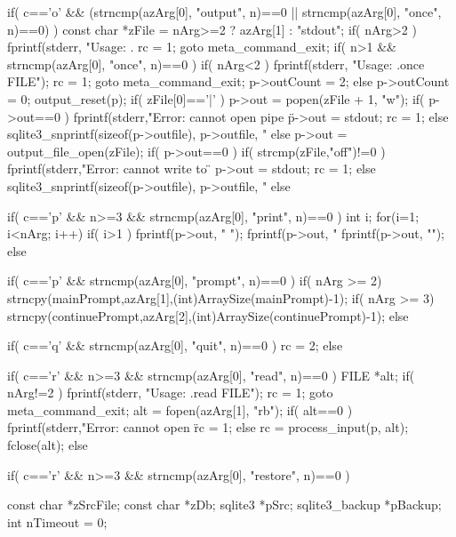 \begin{Codex}[label=shell.c,numbers=left]
{  if( c=='o'
   && (strncmp(azArg[0], "output", n)==0 || strncmp(azArg[0], "once", n)==0)
  ){
    const char *zFile = nArg>=2 ? azArg[1] : "stdout";
    if( nArg>2 ){
      fprintf(stderr, "Usage: .%
      rc = 1;
      goto meta_command_exit;
    }
    if( n>1 && strncmp(azArg[0], "once", n)==0 ){
      if( nArg<2 ){
        fprintf(stderr, "Usage: .once FILE\n");
        rc = 1;
        goto meta_command_exit;
      }
      p->outCount = 2;
    }else{
      p->outCount = 0;
    }
    output_reset(p);
    if( zFile[0]=='|' ){
      p->out = popen(zFile + 1, "w");
      if( p->out==0 ){
        fprintf(stderr,"Error: cannot open pipe \"%
        p->out = stdout;
        rc = 1;
      }else{
        sqlite3_snprintf(sizeof(p->outfile), p->outfile, "%
      }
    }else{
      p->out = output_file_open(zFile);
      if( p->out==0 ){
        if( strcmp(zFile,"off")!=0 ){
          fprintf(stderr,"Error: cannot write to \"%
        }
        p->out = stdout;
        rc = 1;
      } else {
        sqlite3_snprintf(sizeof(p->outfile), p->outfile, "%
      }
    }
  }else

  if( c=='p' && n>=3 && strncmp(azArg[0], "print", n)==0 ){
    int i;
    for(i=1; i<nArg; i++){
      if( i>1 ) fprintf(p->out, " ");
      fprintf(p->out, "%
    }
    fprintf(p->out, "\n");
  }else

  if( c=='p' && strncmp(azArg[0], "prompt", n)==0 ){
    if( nArg >= 2) {
      strncpy(mainPrompt,azArg[1],(int)ArraySize(mainPrompt)-1);
    }
    if( nArg >= 3) {
      strncpy(continuePrompt,azArg[2],(int)ArraySize(continuePrompt)-1);
    }
  }else

  if( c=='q' && strncmp(azArg[0], "quit", n)==0 ){
    rc = 2;
  }else

  if( c=='r' && n>=3 && strncmp(azArg[0], "read", n)==0 ){
    FILE *alt;
    if( nArg!=2 ){
      fprintf(stderr, "Usage: .read FILE\n");
      rc = 1;
      goto meta_command_exit;
    }
    alt = fopen(azArg[1], "rb");
    if( alt==0 ){
      fprintf(stderr,"Error: cannot open \"%
      rc = 1;
    }else{
      rc = process_input(p, alt);
      fclose(alt);
    }
  }else

  if( c=='r' && n>=3 && strncmp(azArg[0], "restore", n)==0 ){
    const char *zSrcFile;
    const char *zDb;
    sqlite3 *pSrc;
    sqlite3_backup *pBackup;
    int nTimeout = 0;

}}
\end{Codex}
